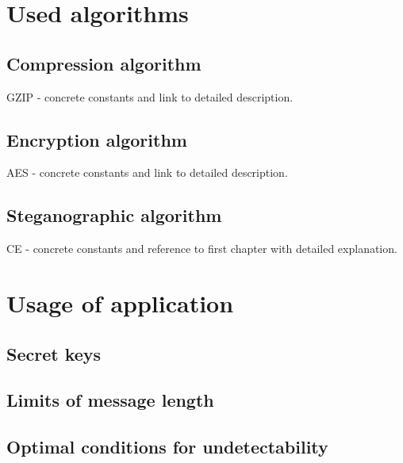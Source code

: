 \section{Used algorithms}

\subsection{Compression algorithm}
\TODO GZIP - concrete constants and link to detailed description.
\subsection{Encryption algorithm}
\TODO AES - concrete constants and link to detailed description.
\subsection{Steganographic algorithm}
\TODO CE - concrete constants and reference to first chapter with detailed explanation.

\section{Usage of application}

\subsection{Secret keys}

\subsection{Limits of message length}

\subsection{Optimal conditions for undetectability}
